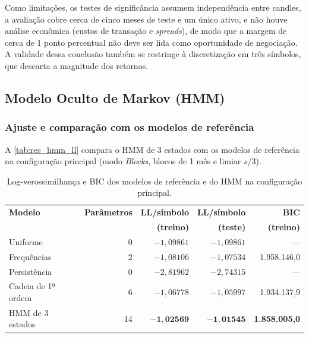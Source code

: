 \documentclass[
    12pt,                %
    openright,           %
    oneside,             %
    a4paper,             %
    english,             %
    brazil               %
]{abntex2}
\begin{document}
Como limitações, os testes de significância assumem independência entre candles, a avaliação cobre cerca de 
cinco meses de teste e um único ativo, e não houve análise econômica (custos de transação e \textit{spreads}), 
de modo que a margem de cerca de 1 ponto percentual não deve ser lida como oportunidade de negociação. A validade dessa conclusão 
também se restringe à discretização em três símbolos, que descarta a magnitude dos retornos.

\subsection{Modelo Oculto de Markov (HMM)}
\label{sec:res_hmm}

\subsubsection{Ajuste e comparação com os modelos de referência}
\label{sec:res_hmm_ajuste}

A \autoref{tab:res_hmm_ll} compara o HMM de 3 estados com os modelos de referência na configuração principal (modo \textit{Blocks}, blocos de 1 mês e limiar $s/3$). 

\begin{table}[htbp]
    \centering
    \caption{Log-verossimilhança e BIC dos modelos de referência e do HMM na configuração principal.}
    \label{tab:res_hmm_ll}
    \small
    \begin{tabular}{@{}lrrrr@{}}
        \toprule
        \textbf{Modelo} & \textbf{Parâmetros} & \textbf{LL/símbolo} & \textbf{LL/símbolo} & \textbf{BIC} \\
         & & \textbf{(treino)} & \textbf{(teste)} & \textbf{(treino)} \\
        \midrule
        Uniforme & 0 & $-1{,}09861$ & $-1{,}09861$ & --- \\
        Frequências & 2 & $-1{,}08106$ & $-1{,}07534$ & 1.958.146,0 \\
        Persistência & 0 & $-2{,}81962$ & $-2{,}74315$ & --- \\
        Cadeia de 1ª ordem & 6 & $-1{,}06778$ & $-1{,}05997$ & 1.934.137,9 \\
        HMM de 3 estados & 14 & $\mathbf{-1{,}02569}$ & $\mathbf{-1{,}01545}$ & \textbf{1.858.005,0} \\
        \bottomrule
    \end{tabular}
\end{table}
\end{document}
